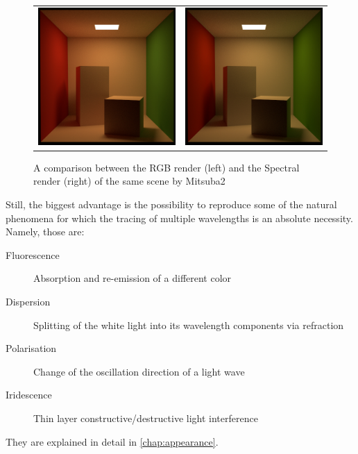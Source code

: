 \begin{figure}[httpb]
	\begin{tabular}{cc}
		\includegraphics[width=.45\linewidth]{img/rgb.jpg}
		&
		\includegraphics[width=.45\linewidth]{img/spectral.jpg}
	\end{tabular}
	\caption{A comparison between the RGB render (left) and the Spectral render (right) of the same scene by Mitsuba2~\cite{mitsubaWeb}}
	\label{fig:compare_color}
\end{figure}

Still, the biggest advantage is the possibility to reproduce some of the natural phenomena for which the tracing of multiple wavelengths is an absolute necessity. Namely, those are:
\begin{description}
	\item[Fluorescence] Absorption and re-emission of a different color
	\item[Dispersion] Splitting of the white light into its wavelength components via refraction
	\item[Polarisation] Change of the oscillation direction of a light wave 
	\item[Iridescence] Thin layer constructive/destructive light interference
\end{description}
They are explained in detail in \autoref{chap:appearance}.

